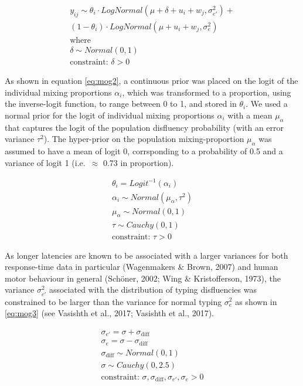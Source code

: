 \documentclass[
  english,
  man,mask,floatsintext]{apa7}
\begin{document}
\[
\tag{7}
\begin{aligned}
    y_{ij} \sim \theta_i \cdot LogNormal(\mu + \delta + u_i + w_j, \sigma_{e'}^2) +\\
        (1 - \theta_i) \cdot LogNormal(\mu + u_i + w_j, \sigma_{e}^2)\\
        \text{where}\\
        \delta \sim Normal(0,1)\\
        \text{constraint: } \delta > 0
\end{aligned}   
\label{eq:mog}
\]

As shown in equation \ref{eq:mog2}, a continuous prior was placed on the logit of the individual mixing proportions \(\alpha_i\), which was transformed to a proportion, using the inverse-logit function, to range between 0 to 1, and stored in \(\theta_i\). We used a normal prior for the logit of individual mixing proportions \(\alpha_i\) with a mean \(\mu_{\alpha}\) that captures the logit of the population disfluency probability (with an error variance \(\tau^2\)). The hyper-prior on the population mixing-proportion \(\mu_{\alpha}\) was assumed to have a mean of logit 0, corrsponding to a probability of 0.5 and a variance of logit 1 (i.e.~\(\approx\) 0.73 in proportion).

\[
\tag{8}
\begin{aligned}
        \theta_i = Logit^{-1}(\alpha_i)\\
        \alpha_i \sim Normal(\mu_{\alpha},\tau^2)\\
        \mu_{\alpha} \sim Normal(0,1)\\
        \tau \sim Cauchy(0,1)\\
        \text{constraint: } \tau > 0
\end{aligned}   
\label{eq:mog2}
\]

As longer latencies are known to be associated with a larger variances for both response-time data in particular (Wagenmakers \& Brown, 2007) and human motor behaviour in general (Schöner, 2002; Wing \& Kristofferson, 1973), the variance \(\sigma_{e'}^2\) associated with the distribution of typing disfluencies was constrained to be larger than the variance for normal typing \(\sigma_e^2\) as shown in \ref{eq:mog3} (see Vasishth et al., 2017; Vasishth et al., 2017).

\[
\tag{9}
\begin{aligned}
        \sigma_{e'} = \sigma + \sigma_{\text{diff}}\\
        \sigma_{e} = \sigma - \sigma_{\text{diff}}\\
        \sigma_{\text{diff}} \sim Normal(0,1)\\
        \sigma \sim Cauchy(0,2.5)\\
        \text{constraint: } \sigma, \sigma_{\text{diff}}, \sigma_{e'}, \sigma_{e} > 0
\end{aligned}   
\label{eq:mog3}
\]
\end{document}
